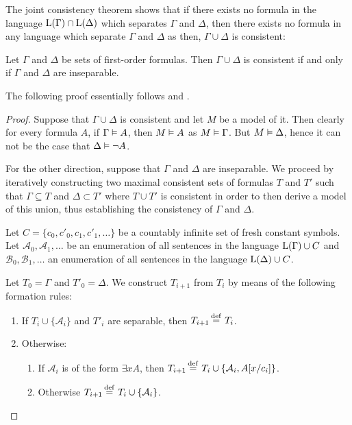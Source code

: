 The joint consistency theorem shows that if there exists no formula in the language $\operatorname{L}(\Gamma)\cap \operatorname{L}(\Delta)$ which separates $\Gamma$ and $\Delta$, then there exists no formula in any language which separate $\Gamma$ and $\Delta$ as then, $\Gamma \cup \Delta$ is consistent:

\begin{thm}
	\label{thm:robinson}
	Let $\Gamma$ and $\Delta$ be sets of first-order formulas.
	Then $\Gamma \cup \Delta$ is consistent if and only if $\Gamma$ and $\Delta$ are inseparable.
\end{thm}
The following proof essentially follows \cite{Henkin63} and \cite{chang1990model}.
\begin{proof}
	Suppose that $\Gamma\cup\Delta$ is consistent and let $M$ be a model of it.
	Then clearly for every formula $A$, if $\Gamma \vDash A$, then $M \vDash A$ as $M \vDash \Gamma$.
	But $M \vDash \Delta$, hence it can not be the case that $\Delta \vDash \lnot A$.

	For the other direction, suppose that $\Gamma$ and $\Delta$ are inseparable.
	We proceed by iteratively constructing two maximal consistent sets of formulas $T$ and $T'$ such that $\Gamma \subseteq T$ and $\Delta \subset T'$ where $T \cup T'$ is consistent in order to then derive a model of this union, thus establishing the consistency of $\Gamma$ and $\Delta$.

	Let $C = \{c_0, c'_0, c_1, c'_1, \dots\}$ be
	a countably infinite set of fresh constant symbols.
	Let $\mathcal{A}_0, \mathcal{A}_1, \dots$ be an enumeration of all sentences in the language $\operatorname{L}(\Gamma) \cup C$
	and $\mathcal{B}_0, \mathcal{B}_1, \dots$ an enumeration of all sentences in the language $\operatorname{L}(\Delta) \cup C$.

	Let $T_0 = \Gamma$ and $T'_0 = \Delta$. 
	We construct
	$T_{i+1}$ 
	from
	$T_{i}$
	by means of the following formation rules:
	\begin{enumerate}[~~(1)]
		\item
			\label{theory_construction_1}
			If $T_{i} \cup \{\mathcal{A}_i\}$ and $T'_{i}$ are separable, then $T_{i+1} \defeq{}\, T_i$.
		\item Otherwise:
			\label{theory_construction_2}
			\begin{enumerate}[(2a)]
			\label{theory_construction_2a}
				\item If $\mathcal{A}_i$ is of the form $\exists x A$, then $T_{i+1} \defeq{}\, T_i \cup \{ \mathcal{A}_i, A\subst{x/c_i} \}$.
			\label{theory_construction_2b}
				\item Otherwise $T_{i+1} \defeq{}\, T_i \cup \{ \mathcal{A}_i \}$.
			\end{enumerate}
	\end{enumerate}


\end{proof}
